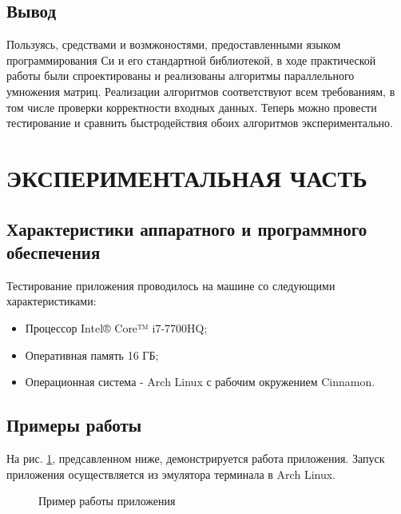\documentclass[a4paper,12pt]{article}
\begin{document}
\newpage
\subsection{Вывод}
Пользуясь, средствами и возмжоностями, предоставленными языком программирования Си и его стандартной библиотекой, в ходе практической работы были спроектированы и реализованы алгоритмы параллельного умножения матриц. Реализации алгоритмов соответствуют всем требованиям, в том числе проверки корректности входных данных. Теперь можно провести тестирование и сравнить быстродействия обоих алгоритмов экспериментально.

\newpage
\section{ЭКСПЕРИМЕНТАЛЬНАЯ ЧАСТЬ}
\subsection{Характеристики аппаратного и программного обеспечения}
Тестирование приложения проводилось на машине со следующими характеристиками:\\
\begin{itemize}
\item Процессор Intel® Core™ i7-7700HQ;
\item Оперативная память 16 ГБ;
\item Операционная система - Arch Linux с рабочим окружением Cinnamon.
\end{itemize}

\newpage
\subsection{Примеры работы}
На рис. \ref{images:example}, предсавленном ниже, демонстрируется работа приложения. Запуск приложения осуществляется из эмулятора терминала в Arch Linux.
\begin{figure}[h]
\caption{Пример работы приложения}
\label{images:example}
\end{figure}
\end{document}
